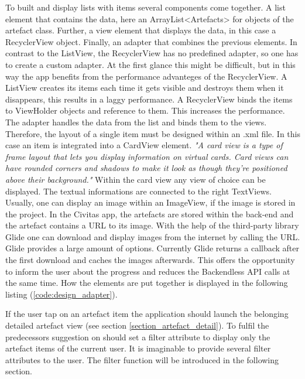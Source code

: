 To built and display lists with items several components come together. A list element that contains the data, here an ArrayList<Artefacts> for objects of the artefact class. Further, a view element that displays the data, in this case a RecyclerView object. Finally, an adapter that combines the previous elements. In contrast to the ListView, the RecyclerView has no predefined adapter, so one has to create a custom adapter. At the first glance this might be difficult, but in this way the app benefits from the performance advanteges of the RecyclerView. A ListView creates its items each time it gets visible and destroys them when it disappears, this results in a laggy performance. A RecyclerView binds the items to ViewHolder objects and reference to them. This increases the performance. 
The adapter handles the data from the list and binds them to the views. Therefore, the layout of a single item must be designed within an .xml file. In this case an item is integrated into a CardView element. \textit{"A card view is a type of frame layout that lets you display information on virtual cards. Card views can have rounded corners and shadows to make it look as though they're positioned above their background."} \citep[p. 542]{Griffiths:2017}
Within the card view any view of choice can be displayed. The textual informations are connected to the right TextViews. Usually, one can display an image within an ImageView, if the image is stored in the project. In the Civitas app, the artefacts are stored within the back-end and the artefact contains a URL to its image. With the help of the third-party library Glide one can download and display images from the internet by calling the URL. Glide provides a large amount of options. Currently Glide returns a callback after the first download and caches the images afterwards. This offers the opportunity to inform the user about the progress and reduces the Backendless API calls at the same time. How the elements are put together is displayed in the following listing (\ref{code:design_adapter}).

\fbox{

}

If the user tap on an artefact item the application should launch the belonging detailed artefact view (see section \ref{section_artefact_detail}). To fulfil the predecessors suggestion on should set a filter attribute to display only the artefact items of the current user. It is imaginable to provide several filter attributes to the user. The filter function will be introduced in the following section.


